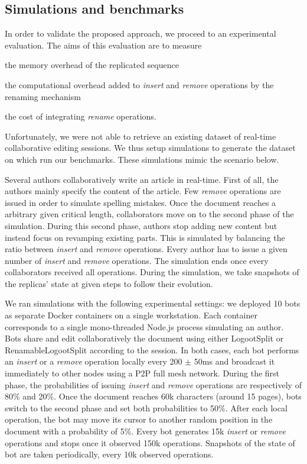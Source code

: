 \documentclass[sigplan,10pt]{acmart}
\begin{document}
\subsection{Simulations and benchmarks}

In order to validate the proposed approach, we proceed to an experimental evaluation.
The aims of this evaluation are to measure
\begin{enumerate*}[label=(\roman*)]
    \item the memory overhead of the replicated sequence
    \item the computational overhead added to \emph{insert} and \emph{remove} operations by the renaming mechanism
    \item the cost of integrating \emph{rename} operations.
\end{enumerate*}

Unfortunately, we were not able to retrieve an existing dataset of real-time collaborative editing sessions.
We thus setup simulations to generate the dataset on which run our benchmarks.
These simulations mimic the scenario below.

Several authors collaboratively write an article in real-time.
First of all, the authors mainly specify the content of the article.
Few \emph{remove} operations are issued in order to simulate spelling mistakes.
Once the document reaches a arbitrary given critical length, collaborators move on to the second phase of the simulation.
During this second phase, authors stop adding new content but instead focus on revamping existing parts.
This is simulated by balancing the ratio between \emph{insert} and \emph{remove} operations.
Every author has to issue a given number of \emph{insert} and \emph{remove} operations.
The simulation ends once every collaborators received all operations.
During the simulation, we take snapshots of the replicas' state at given steps to follow their evolution.

We ran simulations with the following experimental settings: we deployed 10 bots as separate Docker containers on a single workstation.
Each container corresponds to a single mono-threaded Node.js process simulating an author.
Bots share and edit collaboratively the document using either LogootSplit or RenamableLogootSplit according to the session.
In both cases, each bot performs an \emph{insert} or a \emph{remove} operation locally every 200 $\pm$ 50ms and broadcast it immediately to other nodes using a \ac{P2P} full mesh network.
During the first phase, the probabilities of issuing \emph{insert} and \emph{remove} operations are respectively of 80\% and 20\%.
Once the document reaches 60k characters (around 15 pages), bots switch to the second phase and set both probabilities to 50\%.
After each local operation, the bot may move its cursor to another random position in the document with a probability of 5\%.
Every bot generates 15k \emph{insert} or \emph{remove} operations and stops once it observed 150k operations.
Snapshots of the state of bot are taken periodically, every 10k observed operations.
\end{document}
